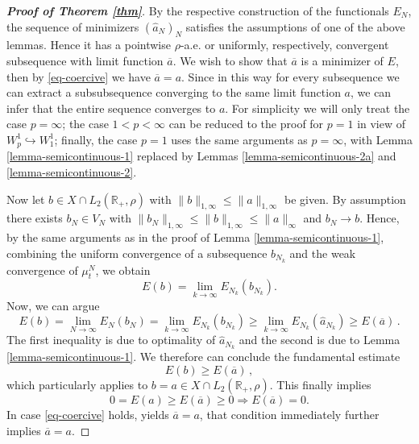 \documentclass[A4paper,11pt]{article}
\theoremstyle{definition}
\newcommand{\R}{\mathbb{R}}
\begin{document}
\begin{proof}[\normalfont\bf Proof of Theorem \ref{thm}]
	By the respective construction of the functionals $E_N$, the sequence of minimizers
	$(\widehat a_N)_N$ satisfies the assumptions of one of the above lemmas. Hence it has a pointwise $\rho$-a.e. or
	uniformly, respectively, convergent subsequence with limit function $\overline a$. We wish to show that
	$\overline a$ is a minimizer of $E$, then by \eqref{eq-coercive} we have $\overline a=a$. Since in this way for
	every subsequence we can extract a subsubsequence converging to the same limit function $a$, we can infer that
	the entire sequence converges to $a$. For simplicity we will only treat the case $p=\infty$; the case $1<p<\infty$
	can be reduced to the proof for $p=1$ in view of $W^1_p\hookrightarrow W^1_1$; finally, the case $p=1$ uses the
	same arguments as $p=\infty$, with Lemma \ref{lemma-semicontinuous-1} replaced by Lemmas
	\ref{lemma-semicontinuous-2a} and \ref{lemma-semicontinuous-2}.
	
	Now let $b\in X\cap L_2(\R_+,\rho)$ with $\|b\|_{1,\infty}\leq\|a\|_{1,\infty}$ be given. By assumption there exists
	$b_N\in V_N$ with $\|b_N\|_{1,\infty}\leq\|b\|_{1,\infty}\leq\|a\|_\infty$ and $b_N\rightarrow b$. Hence, by
	the same arguments as in the proof of Lemma \ref{lemma-semicontinuous-1},
	combining  the uniform convergence of a subsequence $b_{N_k}$ and the weak convergence of $\mu_t^N$, we
	obtain
	\begin{equation*}
		E(b)=\lim_{k\rightarrow\infty}E_{N_k}(b_{N_k}).
	\end{equation*}
	Now, we can argue
	\begin{equation*}
		E(b)=\lim_{N\rightarrow\infty}E_N(b_N)
			= \lim_{k \rightarrow\infty}E_{N_k}(b_{N_k})
			\geq\lim_{k \rightarrow\infty}E_{N_k}(\widehat a_{N_k})
			\geq E(\overline a)\,.
	\end{equation*}
	The first inequality is due to optimality of $\widehat a_{N_k}$ and the second is due to Lemma
	\ref{lemma-semicontinuous-1}. We therefore can conclude the fundamental estimate
	\[
		E(b)\geq E(\overline a)\,,
	\]
	which particularly applies to $b=a\in X\cap L_2(\R_+,\rho)$. This finally implies
	\begin{equation*}
		0=E(a)\geq E(\overline a)\geq 0\Longrightarrow E(\overline a)=0.
	\end{equation*}
	In case \eqref{eq-coercive} holds, yields $\overline a=a$, that condition immediately further implies
	$\overline a=a$.
\end{proof}
\end{document}
